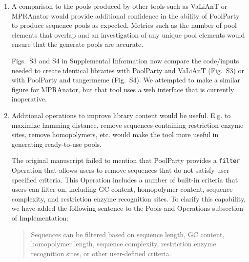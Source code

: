 \documentclass[11pt]{article}
\newenvironment{response}{\par\color{responseblue}}{\par}
\newenvironment{msquote}
  {\begin{quote}\color{quotedtext}\noindent\ignorespaces}
  {\end{quote}}
\begin{document}
\begin{enumerate}
\begin{response}
This is a good suggestion. Our new Supplemental Information document includes a figure, Fig.~S1, that breaks down the forward and backward pass computations in more detail. In this case, the backward pass involves `Pool Final' (the root node) first passing its state (an integer encoding which specific sequence to generate) to `Stack', which then decomposes its state and passes the results to `Pool B' and `Pool C', and so on. 
\end{response}

\item A comparison to the pools produced by other tools such as VaLiAnT or
MPRAnator would provide additional confidence in the ability of PoolParty to
produce sequence pools as expected. Metrics such as the number of pool elements that overlap and an investigation of any unique pool elements would ensure that the generate pools are accurate.

\begin{response}
Figs.~S3 and S4 in Supplemental Information now compare the code/inputs needed to create identical libraries with PoolParty and VaLiAnT (Fig.~S3) or with PoolParty and tangermeme (Fig.~S4). We attempted to make a similar figure for MPRAnator, but that tool uses a web interface that is currently inoperative. 
\end{response}

\item Additional operations to improve library content would be useful. E.g. to maximize hamming distance, remove sequences containing restriction enzyme sites, remove homopolymers, etc. would make the tool more useful in generating ready-to-use pools.

\begin{response}
The original manuscript failed to mention that PoolParty provides a \texttt{filter} Operation that allows users to remove sequences that do not satisfy user-specified criteria. This Operation includes a number of built-in criteria that users can filter on, including GC content, homopolymer content, sequence complexity, and restriction enzyme recognition sites. To clarify this capability, we have added the following sentence to the Pools and Operations subsection of Implementation:

\begin{msquote}
Sequences can be filtered based on sequence length, GC content, homopolymer length, sequence complexity, restriction enzyme recognition sites, or other user-defined criteria.
\end{msquote}
\end{response}


\end{enumerate}
\end{document}
